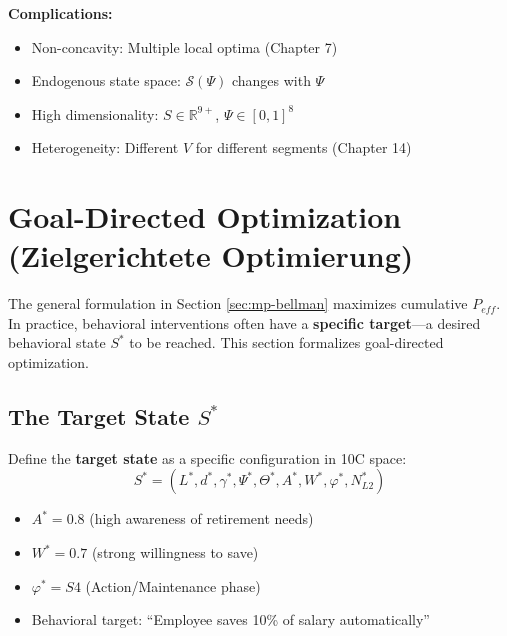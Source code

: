 \textbf{Complications:}
\begin{itemize}
\item Non-concavity: Multiple local optima (Chapter 7)
\item Endogenous state space: $\mathcal{S}(\Psi)$ changes with $\Psi$
\item High dimensionality: $S \in \mathbb{R}^{9+}$, $\Psi \in [0,1]^8$
\item Heterogeneity: Different $V$ for different segments (Chapter 14)
\end{itemize}

\section{Goal-Directed Optimization (Zielgerichtete Optimierung)}
\label{sec:mp-goal-directed}

The general formulation in Section \ref{sec:mp-bellman} maximizes cumulative $P_{eff}$.
In practice, behavioral interventions often have a \textbf{specific target}---a desired
behavioral state $S^*$ to be reached. This section formalizes goal-directed optimization.

\subsection{The Target State $S^*$}

Define the \textbf{target state} as a specific configuration in 10C space:
\begin{equation}
S^* = (L^*, d^*, \gamma^*, \Psi^*, \Theta^*, A^*, W^*, \varphi^*, N^*_{L2})
\label{eq:mp-target}
\end{equation}

\begin{example}
\begin{itemize}
\item $A^* = 0.8$ (high awareness of retirement needs)
\item $W^* = 0.7$ (strong willingness to save)
\item $\varphi^* = S4$ (Action/Maintenance phase)
\item Behavioral target: ``Employee saves 10\% of salary automatically''
\end{itemize}
\end{example}

